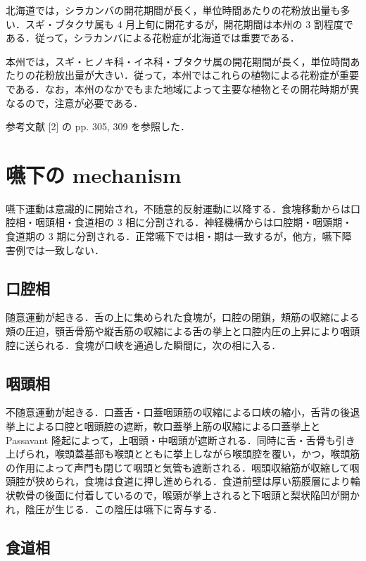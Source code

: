 \documentclass[10pt,uplatex]{jsarticle}
\begin{document}
北海道では，シラカンバの開花期間が長く，単位時間あたりの花粉放出量も多い．スギ・ブタクサ属も 4 月上旬に開花するが，開花期間は本州の 3 割程度である．従って，シラカンバによる花粉症が北海道では重要である．

本州では，スギ・ヒノキ科・イネ科・ブタクサ属の開花期間が長く，単位時間あたりの花粉放出量が大きい．従って，本州ではこれらの植物による花粉症が重要である．なお，本州のなかでもまた地域によって主要な植物とその開花時期が異なるので，注意が必要である．

参考文献 [2] の pp. 305, 309 を参照した．

\section{嚥下の mechanism}

嚥下運動は意識的に開始され，不随意的反射運動に以降する．食塊移動からは口腔相・咽頭相・食道相の 3 相に分割される．神経機構からは口腔期・咽頭期・食道期の 3 期に分割される．正常嚥下では相・期は一致するが，他方，嚥下障害例では一致しない．

\subsection{口腔相}

随意運動が起きる．舌の上に集められた食塊が，口腔の閉鎖，頬筋の収縮による頬の圧迫，顎舌骨筋や縦舌筋の収縮による舌の挙上と口腔内圧の上昇により咽頭腔に送られる．食塊が口峡を通過した瞬間に，次の相に入る．

\subsection{咽頭相}

不随意運動が起きる．口蓋舌・口蓋咽頭筋の収縮による口峡の縮小，舌背の後退挙上による口腔と咽頭腔の遮断，軟口蓋挙上筋の収縮による口蓋挙上と Passavant 隆起によって，上咽頭・中咽頭が遮断される．同時に舌・舌骨も引き上げられ，喉頭蓋基部も喉頭とともに挙上しながら喉頭腔を覆い，かつ，喉頭筋の作用によって声門も閉じて咽頭と気管も遮断される．咽頭収縮筋が収縮して咽頭腔が狭められ，食塊は食道に押し進められる．食道前壁は厚い筋膜層により輪状軟骨の後面に付着しているので，喉頭が挙上されると下咽頭と梨状陥凹が開かれ，陰圧が生じる．この陰圧は嚥下に寄与する．

\subsection{食道相}
\end{document}
